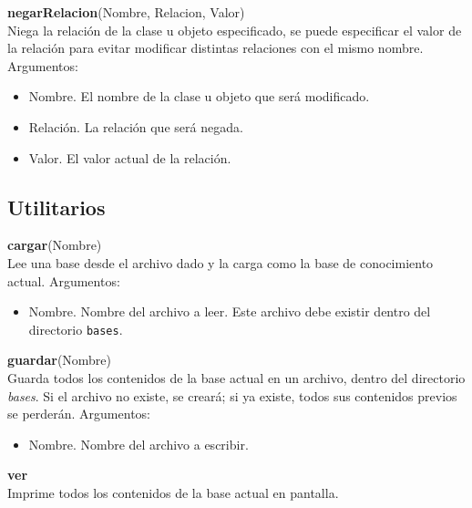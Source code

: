 \documentclass[11pt]{article}
\newcommand{\comando}[2]{
    \textbf{#1}(#2)\\
}
\newenvironment{args}{
    \newline
    Argumentos:
    \begin{itemize}
}{
    \end{itemize}
    \bigskip
}
\begin{document}
\comando{negarRelacion}{Nombre, Relacion, Valor}
Niega la relación de la clase u objeto especificado, se puede especificar el valor de la relación para evitar modificar distintas relaciones con el mismo nombre.
\begin{args}
\item Nombre. El nombre de la clase u objeto que será modificado.
\item Relación. La relación que será negada.
\item Valor. El valor actual de la relación.
\end{args}


\subsection{Utilitarios}

\comando{cargar}{Nombre}
Lee una base desde el archivo dado y la carga como la base de conocimiento actual.
\begin{args}
    \item Nombre. Nombre del archivo a leer. Este archivo debe existir dentro del directorio \texttt{bases}.
\end{args}

\comando{guardar}{Nombre}
Guarda todos los contenidos de la base actual en un archivo, dentro del directorio \textit{bases}. Si el archivo no existe, se creará; si ya existe, todos sus contenidos previos se perderán.
\begin{args}
    \item Nombre. Nombre del archivo a escribir.
\end{args}

\textbf{ver}\\
Imprime todos los contenidos de la base actual en pantalla.
\end{document}
